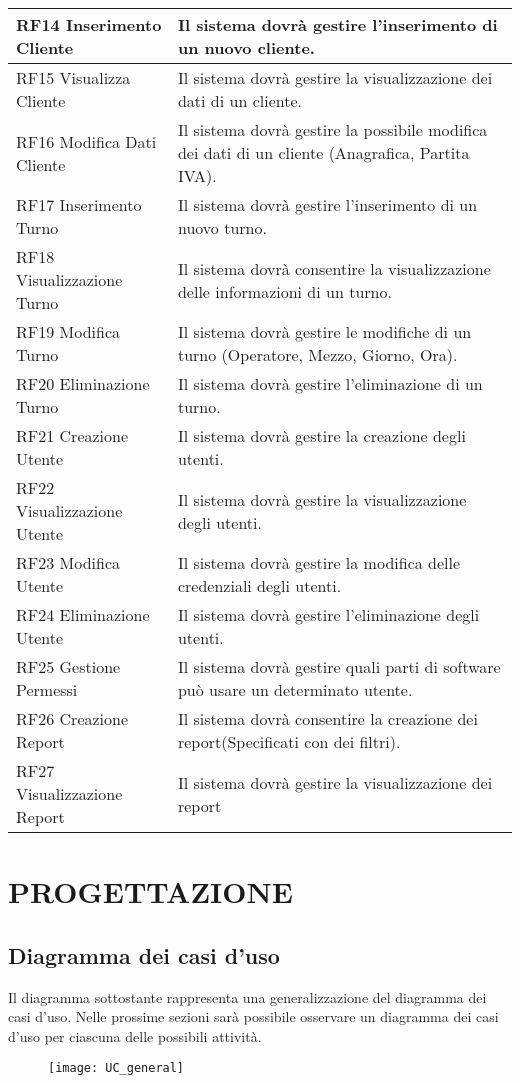 \documentclass[green, fancy, 11pt]{elegantbook}
\begin{document}
\begin{center}
{\begin{tabular}{|p{5cm}|p{10cm}|}
	\hline
	RF14 Inserimento Cliente & Il sistema dovrà gestire l'inserimento di un nuovo cliente.\\
	\hline
	RF15 Visualizza Cliente & Il sistema dovrà gestire la visualizzazione dei dati di un cliente.\\
	\hline
	RF16 Modifica Dati Cliente & Il sistema dovrà gestire la possibile modifica dei dati di un cliente (Anagrafica, Partita IVA).\\
	\hline
	RF17 Inserimento Turno & Il sistema dovrà gestire l'inserimento di un nuovo turno.\\
	\hline
	RF18 Visualizzazione Turno & Il sistema dovrà consentire la visualizzazione delle informazioni di un turno.\\
	\hline
	RF19 Modifica Turno & Il sistema dovrà gestire le modifiche di un turno (Operatore, Mezzo, Giorno, Ora).\\
	\hline
	RF20 Eliminazione Turno& Il sistema dovrà gestire l'eliminazione di un turno.\\
	\hline
	RF21 Creazione Utente& Il sistema dovrà gestire la creazione degli utenti.\\
	\hline
	RF22 Visualizzazione Utente& Il sistema dovrà gestire la visualizzazione degli utenti.\\
	\hline
	RF23 Modifica Utente& Il sistema dovrà gestire la modifica delle credenziali degli utenti.\\
	\hline
	RF24 Eliminazione Utente& Il sistema dovrà gestire l'eliminazione degli utenti.\\
	\hline
	RF25 Gestione Permessi&Il sistema dovrà gestire quali parti di software può usare un determinato utente.\\
	\hline
	RF26 Creazione Report&Il sistema dovrà consentire la creazione dei report(Specificati con dei filtri).\\
	\hline
	RF27 Visualizzazione Report&Il sistema dovrà gestire la visualizzazione dei report\\
	\hline
\end{tabular}
}
\end{center}

\chapter{PROGETTAZIONE}
\section{Diagramma dei casi d'uso}
\noindent
Il diagramma sottostante rappresenta una generalizzazione del diagramma dei casi d'uso. Nelle prossime sezioni sarà possibile osservare un diagramma dei casi d'uso per ciascuna delle possibili attività.\\
\small
\begin{figure}[H]
	\texttt{[image: UC\_general]}
\end{figure}
\newpage
\end{document}
